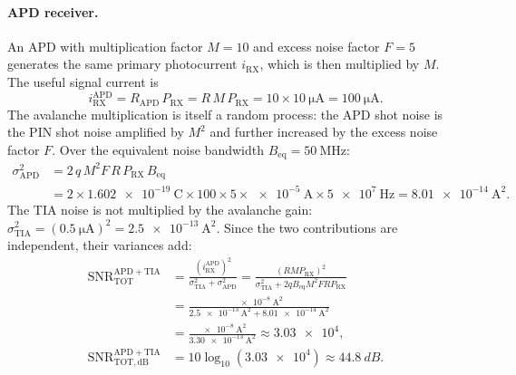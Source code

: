 \paragraph{APD receiver.}
An APD with multiplication factor $M = 10$ and excess noise factor $F = 5$ generates the same
primary photocurrent $i_\mathrm{RX}$, which is then multiplied by $M$.
The useful signal current is
\begin{equation}
  i_\mathrm{RX}^\mathrm{APD} = R_\mathrm{APD}\, P_\mathrm{RX} = R\, M\, P_\mathrm{RX} = 10 \times \SI{10}{\micro\ampere} = \SI{100}{\micro\ampere}.
\end{equation}
The avalanche multiplication is itself a random process: the APD shot noise is the PIN shot noise
amplified by $M^2$ and further increased by the excess noise factor $F$.
Over the equivalent noise bandwidth $B_\mathrm{eq} = \SI{50}{\mega\hertz}$:
\begin{equation}
\begin{aligned}
  \sigma_\mathrm{APD}^2 &= 2\, q\, M^2 F\, R\, P_\mathrm{RX}\, B_\mathrm{eq} \\
  &= 2\times\SI{1.602e-19}{\coulomb}\times 100\times 5\times\SI{e-5}{\ampere}\times\SI{5e7}{\hertz}
  = \SI{8.01e-14}{\ampere\squared}.
\end{aligned}
\end{equation}
The TIA noise is not multiplied by the avalanche gain:
$\sigma_\mathrm{TIA}^2 = (\SI{0.5}{\micro\ampere})^2 = \SI{2.5e-13}{\ampere\squared}$.
Since the two contributions are independent, their variances add:
\begin{equation}
\begin{aligned}
  \mathrm{SNR}^\mathrm{APD+TIA}_\mathrm{TOT}
  &= \frac{\left(i_\mathrm{RX}^\mathrm{APD}\right)^2}{\sigma_\mathrm{TIA}^2 + \sigma_\mathrm{APD}^2}
  = \frac{(R M P_\mathrm{RX})^2}{\sigma_\mathrm{TIA}^2 + 2 q B_\mathrm{eq} M^2 F R P_\mathrm{RX}} \\
  &= \frac{\SI{e-8}{\ampere\squared}}{\SI{2.5e-13}{\ampere\squared}+\SI{8.01e-14}{\ampere\squared}} \\
  &= \frac{\SI{e-8}{\ampere\squared}}{\SI{3.30e-13}{\ampere\squared}}
  \approx \num{3.03e4}, \\
  \mathrm{SNR}^\mathrm{APD+TIA}_\mathrm{TOT,dB} &= 10\log_{10}(\num{3.03e4}) \approx \SI{44.8}{dB}.
\end{aligned}
\end{equation}

